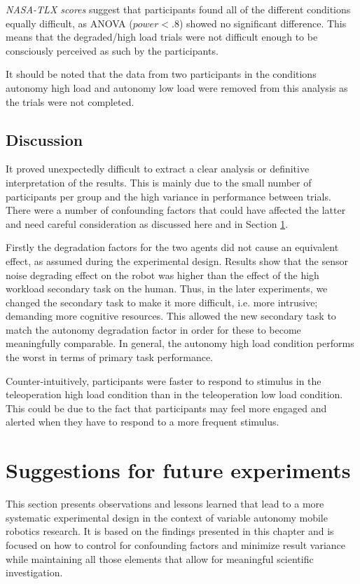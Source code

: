 \documentclass[a4paper,12pt,oneside,openright]{bhamthesis}
\begin{document}
\textit{NASA-TLX scores} suggest that participants found all of the different conditions equally difficult, as ANOVA (\textit{$power < .8$}) showed no significant difference. This means that the degraded/high load trials were not difficult enough to be consciously perceived as such  by the participants.

It should be noted that the data from two participants in the conditions autonomy high load and autonomy low load were removed from this analysis as the trials were not completed.

\subsection{Discussion}
It proved unexpectedly difficult to extract a clear analysis or definitive interpretation of the results. This is mainly due to the small number of participants per group and the high variance in performance between trials. There were a number of confounding factors that could have affected the latter and need careful consideration as discussed here and in Section \ref{chap3:guidelines}.

Firstly the degradation factors for the two agents did not cause an equivalent effect, as assumed during the experimental design. Results show that the sensor noise degrading effect on the robot was higher than the effect of the high workload secondary task on the human. Thus, in the later experiments, we changed the secondary task to make it more difficult, i.e. more intrusive; demanding more cognitive resources. This allowed the new secondary task to match the autonomy degradation factor in order for these to become meaningfully comparable. In general, the autonomy high load condition performs the worst in terms of primary task performance.

Counter-intuitively, participants were faster to respond to stimulus in the teleoperation high load condition than in the teleoperation low load condition. This could be due to the fact that participants may feel more engaged and alerted when they have to respond to a more frequent stimulus.

\section{Suggestions for future experiments}
\label{chap3:guidelines}
This section presents observations and lessons learned that lead to a more systematic experimental design in the context of variable autonomy mobile robotics research. It is based on the findings presented in this chapter and is focused on how to control for confounding factors and minimize result variance while maintaining all those elements that allow for meaningful scientific investigation.
\end{document}
